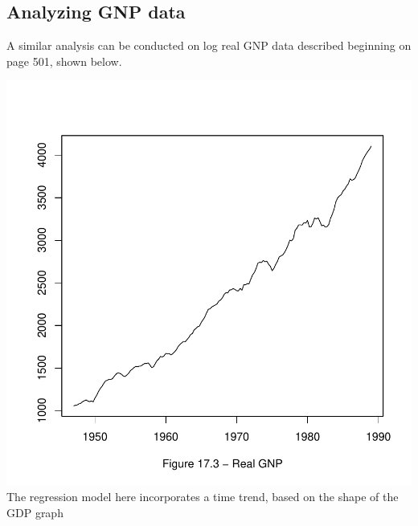 \subsection{Analyzing GNP data}
A similar analysis can be conducted on log real GNP data described beginning on page 501, shown below.
\begin{Schunk}
\end{Schunk}
\includegraphics{p489-012}
The regression model here incorporates a time trend, based on the shape of the GDP graph
